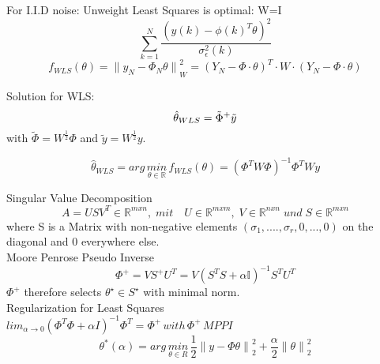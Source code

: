 \begin{tcolorbox}[colback=red!5!white,colframe=red!75!black,title=\textbf{Weighted Least Squares (unitless)}]
For I.I.D noise: Unweight Least Squares is optimal: W=I
\begin{equation*}
\sum _{ k=1 }^{ N }\frac {{{ (y(k)-{ \phi (k) }^{ T }\theta )}^{2  } }}{\sigma_{\epsilon}^{2}(k)}
\end{equation*}
\begin{equation*}
{ f }_{ WLS }(\theta )={ \parallel { y }_{ N }-{ \Phi  }_{ N }\theta \parallel  }_{ W }^{ 2 }={ ({ Y }_{ N }-\Phi \cdot \theta ) }^{ T }\cdot W\cdot  ({ Y }_{ N }-\Phi \cdot \theta )
\end{equation*}

Solution for WLS:
\begin{equation*}
\hat{\theta}_{WLS} = \tilde{\Phi}^+\tilde{y} \\
\end{equation*}
with $\tilde{\Phi} = W^{\frac{1}{2}} \Phi$ and $\tilde{y} = W^{\frac{1}{2}} y$.


\begin{equation*}
{ \hat{\theta} }_{ WLS }=arg\, \underset{ \theta \in \mathbb{R} }{ min }\,{f  }_{WLS  }(\theta)={ ({\Phi}^{T}W\Phi) }^{ -1 }{\Phi}^{T} Wy
\end{equation*}
\end{tcolorbox}
\begin{tcolorbox}[colback=red!5!white,colframe=red!75!black,title=\textbf{Ill-Posed Least Squares}]
	
Singular Value Decomposition
\begin{equation*}
A=US{ V }^{ T } \in\mathbb{{R}}^{mxn}, \; mit\quad U\in\mathbb{{R}}^{mxm}, \; V\in\mathbb{{R}}^{nxn} \; und \; S\in\mathbb{{R}}^{mxn}
\end{equation*}
where S is a Matrix with non-negative elements $(\sigma_1,....,\sigma_r, 0,...,0)$ on the diagonal and 0 everywhere else.\\
Moore Penrose Pseudo Inverse
\begin{equation*}
{ \Phi  }^{ + }=V{ S }^{+}{U}^{T} = V(S^TS+\alpha\mathbb{I})^{-1}S^TU^T
\end{equation*}
$\Phi^+$ therefore selects $\theta^\star \in S^\star$ with minimal norm.
\\

Regularization for Least Squares\\
\( { lim }_{ \alpha \rightarrow 0 }{ ({ \Phi  }^{ T }\Phi +\alpha { I }) }^{ -1 }{ \Phi  }^{ T }={ \Phi  }^{ + }\, with\,{ \Phi  }^{ + }\, MPPI \)
\begin{equation*}
{ \theta  }^{ * }(\alpha )=arg\, \underset { \theta \in { R } }{ min } \, \frac { 1 }{ 2 } {\parallel y-\Phi\theta \parallel}_{2}^{2}+\frac { \alpha }{ 2 } {\parallel \theta\parallel}_{2}^{2}
\end{equation*}
\end{tcolorbox}

